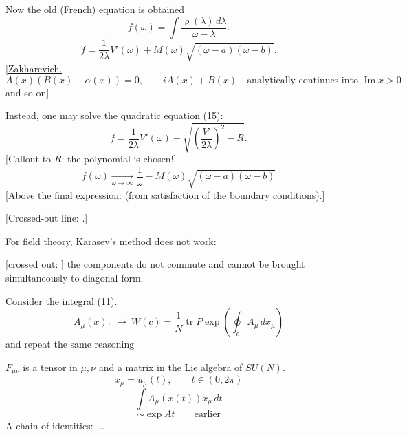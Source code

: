 Now the old (French) equation is obtained
\begin{equation*}
f(\omega)=\int\frac{\varrho(\lambda)\,d\lambda}{\omega-\lambda}. \tag{21}
\end{equation*}
\begin{equation*}
f=\frac1{2\lambda}V'(\omega)+M(\omega)\sqrt{(\omega-a)(\omega-b)}. \tag{22}
\end{equation*}
[\underline{Zakharevich.}
\begin{equation*}
A(x)(B(x)-\alpha(x))=0,\qquad
 iA(x)+B(x)\quad\text{analytically continues into }\operatorname{Im}x>0
\end{equation*}
and so on]

Instead, one may solve the quadratic equation (15):
\begin{equation*}
f=\frac1{2\lambda}V'(\omega)-\sqrt{\left(\frac{V'}{2\lambda}\right)^2-R}. \tag{23}
\end{equation*}
[Callout to $R$: the polynomial is chosen!]
\begin{equation*}
f(\omega)\underset{\omega\to\infty}{\longrightarrow}
\frac1\omega-M(\omega)\sqrt{(\omega-a)(\omega-b)} \tag{24}
\end{equation*}
[Above the final expression: (from satisfaction of the boundary conditions).]

[Crossed-out line:
.]

For field theory, Karasev's method does not work:

[crossed out: ]
the components do not commute and cannot be brought simultaneously to diagonal form.

Consider the integral (11).
\begin{equation*}
A_\mu(x):\ \longrightarrow\ W(c)=\frac1N\operatorname{tr}
 P\exp\left(\oint_c A_\mu\,dx_\mu\right) \tag{25}
\end{equation*}
and repeat the same reasoning

$F_{\mu\nu}$ is a tensor in $\mu,\nu$ and a matrix in the Lie algebra of $SU(N)$.
\begin{equation*}
x_\mu=u_\mu(t),\qquad t\in(0,2\pi)
\end{equation*}
\begin{equation*}
\int A_\mu(x(t))\dot x_\mu\,dt
\end{equation*}
\begin{equation*}
\sim\exp At\qquad\text{earlier}
\end{equation*}
A chain of identities: $\ldots$


